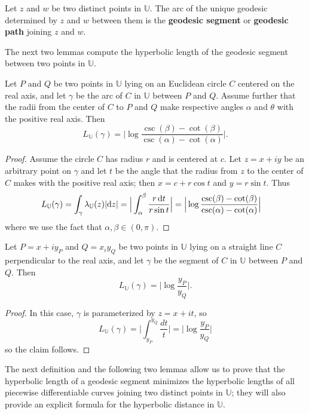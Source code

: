 \begin{definition}
Let $z$ and $w$ be two distinct points in $\mathbb{U}$. The arc of the unique geodesic determined by $z$ and $w$ between them is the \textbf{geodesic segment} or \textbf{geodesic path} joining $z$ and $w$.
\end{definition}
The next two lemmas compute the hyperbolic length of the geodesic segment between two points in $\mathbb{U}$.
\begin{lemma}
Let $P$ and $Q$ be two points in $\mathbb{U}$ lying on an Euclidean circle $C$ centered on the real axis, and let $\gamma$ be the arc of $C$ in $\mathbb{U}$ between $P$ and $Q$. Assume further that the radii from the center of $C$ to $P$ and $Q$ make respective angles $\alpha$ and $\theta$ with the positive real axis. Then
\[L_{\mathbb{U}}(\gamma)=\Big|\log\frac{\csc(\beta)-\cot(\beta)}{\csc(\alpha)-\cot(\alpha)}\Big|.\]
\end{lemma}
\begin{proof}
Assume the circle $C$ has radius $r$ and is centered at $c$. Let $z=x+iy$ be an arbitrary point on $\gamma$ and let $t$ be the angle that the radius from $z$ to the center of $C$ makes with the positive real axis; then $x=c+r\cos t$ and $y=r\sin t$. Thus
\begin{align*}
L_{\mathbb{U}}(\gamma)&=\int_{\gamma}\lambda_{\mathbb{U}}(z)|\mathrm{d}z|=\Big|\int_{\alpha}^{\beta}\frac{r\mathop{}\!\mathrm{d} t}{r\sin t}\Big|=\Big|\log\frac{\csc(\beta)-\cot(\beta)}{\csc(\alpha)-\cot(\alpha)}\Big|
\end{align*}
where we use the fact that $\alpha,\beta\in(0,\pi)$.
\end{proof}
\begin{lemma}
Let $P=x+iy_P$ and $Q=x_iy_Q$ be two points in $\mathbb{U}$ lying on a straight line $C$ perpendicular to the real axis, and let $\gamma$ be the segment of $C$ in $\mathbb{U}$ between $P$ and $Q$. Then
\[L_{\mathbb{U}}(\gamma)=\Big|\log\frac{y_P}{y_Q}\Big|.\]
\end{lemma}
\begin{proof}
In this case, $\gamma$ is parameterized by $z=x+it$, so
\[L_{\mathbb{U}}(\gamma)=\Big|\int_{y_P}^{y_Q}\frac{dt}{t}\Big|=\Big|\log\frac{y_P}{y_Q}\Big|\]
so the claim follows.
\end{proof}
The next definition and the following two lemmas allow us to prove that the
hyperbolic length of a geodesic segment minimizes the hyperbolic lengths of all piecewise differentiable curves joining two distinct points in $\mathbb{U}$; they will also provide an explicit formula for the hyperbolic distance in $\mathbb{U}$.
